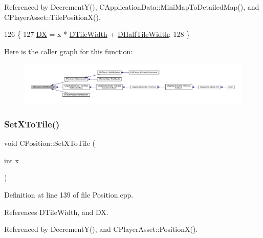 Referenced by Decrement\+Y(), C\+Application\+Data\+::\+Mini\+Map\+To\+Detailed\+Map(), and C\+Player\+Asset\+::\+Tile\+Position\+X().


\begin{DoxyCode}
126                                  \{
127     \hyperlink{classCPosition_a28445f9b872169715919074d82044eda}{DX} = x * \hyperlink{classCPosition_ac17d12fb5d35fcf62d63bb42e8cf7ed6}{DTileWidth} + \hyperlink{classCPosition_a3227e835d9008346e9d91bdad2380f14}{DHalfTileWidth};
128 \}
\end{DoxyCode}
Here is the caller graph for this function\+:\nopagebreak
\begin{figure}[H]
\begin{center}
\leavevmode
\includegraphics[width=350pt]{classCPosition_ac6a1eeaeb98e20942efea7cf253b2ec4_icgraph}
\end{center}
\end{figure}
\hypertarget{classCPosition_a12795d06d34e608697b7b4c9bf202a10}{}\label{classCPosition_a12795d06d34e608697b7b4c9bf202a10} 
\subsubsection{\texorpdfstring{Set\+X\+To\+Tile()}{SetXToTile()}}
{\footnotesize\ttfamily void C\+Position\+::\+Set\+X\+To\+Tile (\begin{DoxyParamCaption}\item[{int}]{x }\end{DoxyParamCaption})}



Definition at line 139 of file Position.\+cpp.



References D\+Tile\+Width, and DX.



Referenced by Decrement\+Y(), and C\+Player\+Asset\+::\+Position\+X().


